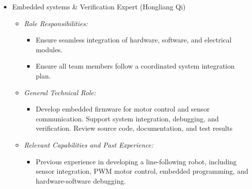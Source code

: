 \documentclass{article}
\begin{document}
\begin{itemize}
\begin{itemize}
    	\item \textit{General Technical Role:}
    	\begin{itemize}
    		\item Assist with design and implementation of software architecture for robot autonomy 
    		\item Design of simulation environment to prototype and validate approach. 
    	\end{itemize}
    	
    	\item \textit{Relevant Capabilities and Past Experience:}
    	\begin{itemize}
    		\item 16 months of cumulative research experience in robotics, focusing on, safe local navigation, evolutionary computing and optimal sensor placement. 
    		\item 4 months of industry experience at stealth startup working on deployment of computer vision system for anomaly detection in agricultural crops. 
    	\end{itemize}
    \end{itemize}
    
    \item Embedded systems \& Verification Expert  (Hongliang Qi) \label{role:embedded_expert}
    \begin{itemize}
    	\item \textit{Role Responsibilities:}
    	\begin{itemize}
    		\item Ensure seamless integration of hardware, software, and electrical modules.
    		\item Ensure all team members follow a coordinated system integration plan. 
    	\end{itemize}
    	
    	\item \textit{General Technical Role:}
    	\begin{itemize}
			\item Develop embedded firmware for motor control and sensor communication. Support system integration, debugging, and verification. Review source code, documentation, and test results
    	\end{itemize}
    	
    	\item \textit{Relevant Capabilities and Past Experience:}
    	\begin{itemize}
    		\item Previous experience in developing a line-following robot, including sensor integration, PWM motor control, embedded programming, and hardware-software debugging. 
    	\end{itemize}	
    	

\end{itemize}
\end{itemize}
\end{document}
